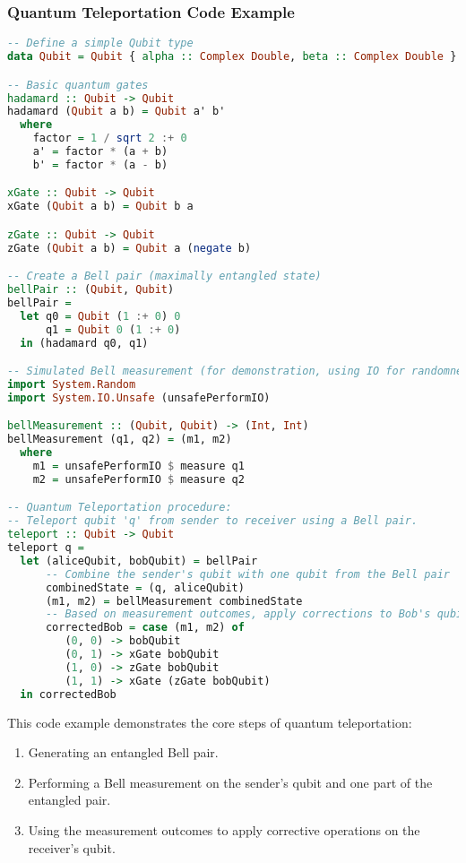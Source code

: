 \documentclass[12pt]{article}
\begin{document}
\subsubsection{Quantum Teleportation Code Example}
\begin{lstlisting}[language=Haskell]
-- Define a simple Qubit type
data Qubit = Qubit { alpha :: Complex Double, beta :: Complex Double }

-- Basic quantum gates
hadamard :: Qubit -> Qubit
hadamard (Qubit a b) = Qubit a' b'
  where
    factor = 1 / sqrt 2 :+ 0
    a' = factor * (a + b)
    b' = factor * (a - b)

xGate :: Qubit -> Qubit
xGate (Qubit a b) = Qubit b a

zGate :: Qubit -> Qubit
zGate (Qubit a b) = Qubit a (negate b)

-- Create a Bell pair (maximally entangled state)
bellPair :: (Qubit, Qubit)
bellPair =
  let q0 = Qubit (1 :+ 0) 0
      q1 = Qubit 0 (1 :+ 0)
  in (hadamard q0, q1)

-- Simulated Bell measurement (for demonstration, using IO for randomness)
import System.Random
import System.IO.Unsafe (unsafePerformIO)

bellMeasurement :: (Qubit, Qubit) -> (Int, Int)
bellMeasurement (q1, q2) = (m1, m2)
  where
    m1 = unsafePerformIO $ measure q1
    m2 = unsafePerformIO $ measure q2

-- Quantum Teleportation procedure:
-- Teleport qubit 'q' from sender to receiver using a Bell pair.
teleport :: Qubit -> Qubit
teleport q =
  let (aliceQubit, bobQubit) = bellPair
      -- Combine the sender's qubit with one qubit from the Bell pair
      combinedState = (q, aliceQubit)
      (m1, m2) = bellMeasurement combinedState
      -- Based on measurement outcomes, apply corrections to Bob's qubit
      correctedBob = case (m1, m2) of
         (0, 0) -> bobQubit
         (0, 1) -> xGate bobQubit
         (1, 0) -> zGate bobQubit
         (1, 1) -> xGate (zGate bobQubit)
  in correctedBob
\end{lstlisting}
This code example demonstrates the core steps of quantum teleportation:
\begin{enumerate}
  \item Generating an entangled Bell pair.
  \item Performing a Bell measurement on the sender's qubit and one part of the entangled pair.
  \item Using the measurement outcomes to apply corrective operations on the receiver's qubit.
\end{enumerate}
\end{document}
